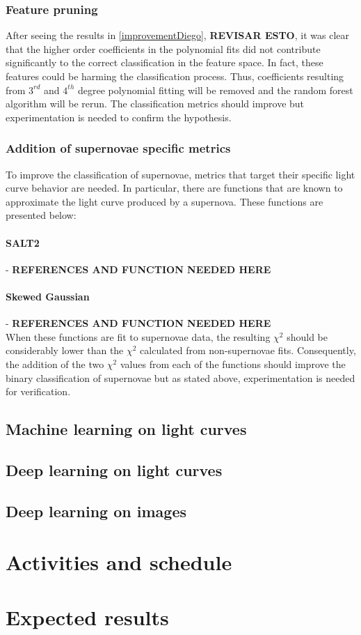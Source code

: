 \subsubsection{Feature pruning}

After seeing the results in \ref{improvementDiego}, \textbf{REVISAR ESTO}, it was clear that the higher order coefficients in the polynomial fits did not contribute significantly to the correct classification in the feature space. In fact, these features could be harming the classification process. Thus, coefficients resulting from $3^{rd}$ and $4^{th}$ degree polynomial fitting will be removed and the random forest algorithm will be rerun. The classification metrics should improve but experimentation is needed to confirm the hypothesis.  

\subsubsection{Addition of supernovae specific metrics}

To improve the classification of supernovae, metrics that target their specific light curve behavior are needed. In particular, there are functions that are known to approximate the light curve produced by a supernova. These functions are presented below: 

\paragraph{SALT2} - \textbf{REFERENCES AND FUNCTION NEEDED HERE}\\

\paragraph{Skewed Gaussian} - \textbf{REFERENCES AND FUNCTION NEEDED HERE} \\ 

When these functions are fit to supernovae data, the resulting $\chi^2$ should be considerably lower than the $\chi^2$ calculated from non-supernovae fits. Consequently, the addition of the two $\chi^2$  values from each of the functions should improve the binary classification of supernovae but as stated above, experimentation is needed for verification.

\subsection{Machine learning on light curves}
\subsection{Deep learning on light curves}
\subsection{Deep learning on images}
\section{Activities and schedule}
\section{Expected results}


\newpage
\printbibliography

